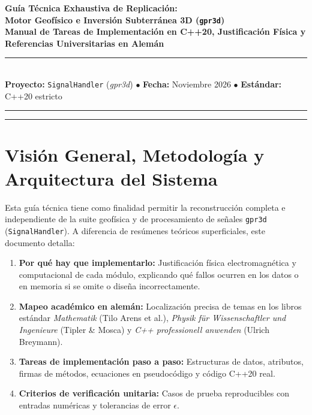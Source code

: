 \documentclass[11pt,a4paper]{article}
\begin{document}
\begin{center}
    {\LARGE \textbf{Guía Técnica Exhaustiva de Replicación:\\[0.2cm] Motor Geofísico e Inversión Subterránea 3D (\texttt{gpr3d})}}\\[0.4cm]
    {\Large \textbf{Manual de Tareas de Implementación en C++20, Justificación Física y Referencias Universitarias en Alemán}}\\[0.3cm]
    \rule{\textwidth}{1.2pt}\\[0.2cm]
    \textbf{Proyecto:} \texttt{SignalHandler} (\textit{gpr3d}) \quad $\bullet$ \quad \textbf{Fecha:} Noviembre 2026 \quad $\bullet$ \quad \textbf{Estándar:} C++20 estricto\\
    \rule{\textwidth}{0.6pt}
\end{center}

\vspace{0.2cm}
\tableofcontents
\vspace{0.4cm}
\hrule
\vspace{0.4cm}

\section{Visión General, Metodología y Arquitectura del Sistema}

Esta guía técnica tiene como finalidad permitir la reconstrucción completa e independiente de la suite geofísica y de procesamiento de señales \texttt{gpr3d} (\texttt{SignalHandler}). A diferencia de resúmenes teóricos superficiales, este documento detalla:
\begin{enumerate}
    \item \textbf{Por qué hay que implementarlo:} Justificación física electromagnética y computacional de cada módulo, explicando qué fallos ocurren en los datos o en memoria si se omite o diseña incorrectamente.
    \item \textbf{Mapeo académico en alemán:} Localización precisa de temas en los libros estándar \textit{Mathematik} (Tilo Arens et al.), \textit{Physik für Wissenschaftler und Ingenieure} (Tipler \& Mosca) y \textit{C++ professionell anwenden} (Ulrich Breymann).
    \item \textbf{Tareas de implementación paso a paso:} Estructuras de datos, atributos, firmas de métodos, ecuaciones en pseudocódigo y código C++20 real.
    \item \textbf{Criterios de verificación unitaria:} Casos de prueba reproducibles con entradas numéricas y tolerancias de error $\epsilon$.
\end{enumerate}
\end{document}
